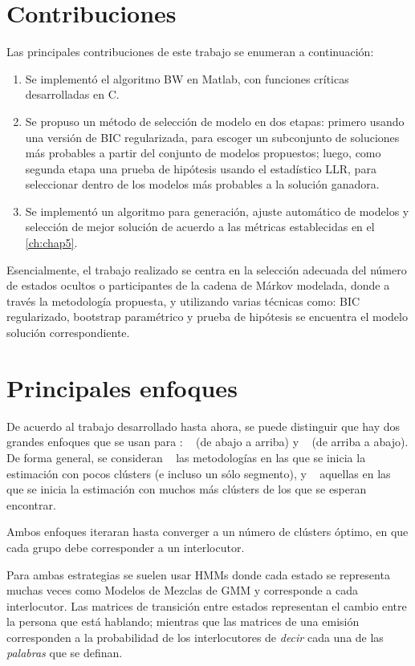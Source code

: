 \section{Contribuciones}

Las principales contribuciones de este trabajo se enumeran a continuación:

\begin{enumerate}
\item Se implementó el algoritmo \ac{BW} en Matlab, con funciones críticas desarrolladas en C.
\item Se propuso un método de selección de modelo en dos etapas: primero usando una versión de \acf{BIC} regularizada, para escoger un subconjunto de soluciones más probables a partir del conjunto de modelos propuestos; luego, como segunda etapa una prueba de hipótesis usando el estadístico \acf{LLR}, para seleccionar dentro de los modelos más probables a la solución ganadora.
\item Se implementó un algoritmo para generación, ajuste automático de modelos y selección de mejor solución de acuerdo a las métricas establecidas en el \autoref{ch:chap5}.
\end{enumerate}

Esencialmente, el trabajo realizado se centra en la selección adecuada del número de estados ocultos o participantes de la cadena de Márkov modelada, donde a través la metodología propuesta, y utilizando varias técnicas como: \ac{BIC} regularizado, bootstrap paramétrico y prueba de hipótesis se encuentra el modelo solución correspondiente.

\section{Principales enfoques}
\label{sec:previo}

De acuerdo al trabajo desarrollado hasta ahora, se puede distinguir que hay dos grandes enfoques que se usan para \sd: \bu~ (de abajo a arriba) y \td~ (de arriba a abajo). De forma general, se consideran \bu~ las metodologías en las que se inicia la estimación con pocos clústers (e incluso un sólo segmento), y \td~ aquellas en las que se inicia la estimación con muchos más clústers de los que se esperan encontrar.

Ambos enfoques iteraran hasta converger a un número de clústers óptimo, en que cada grupo debe corresponder a un interlocutor.

Para ambas estrategias se suelen usar \acp{HMM} donde cada estado se representa muchas veces como Modelos de Mezclas de \ac{GMM} y corresponde a cada interlocutor. Las matrices de transición entre estados representan el cambio entre la persona que está hablando; mientras que las matrices de una emisión corresponden a la probabilidad de los interlocutores de \textit{decir} cada una de las \textit{palabras} que se definan.

